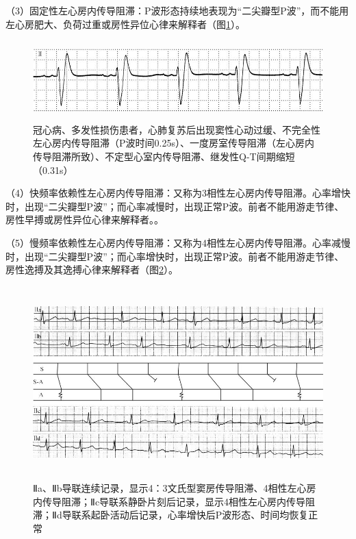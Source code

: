 （3）固定性左心房内传导阻滞：P波形态持续地表现为“二尖瓣型P波”，而不能用左心房肥大、负荷过重或房性异位心律来解释者（图\ref{fig19-5}）。

\begin{figure}[!htbp]
 \centering
 \includegraphics[width=5.60417in,height=1.20833in]{./images/Image00321.jpg}
 \captionsetup{justification=centering}
 \caption{冠心病、多发性损伤患者，心肺复苏后出现窦性心动过缓、不完全性左心房内传导阻滞（P波时间0.25s）、一度房室传导阻滞（左心房内传导阻滞所致）、不定型心室内传导阻滞、继发性Q-T间期缩短（0.31s）}
 \label{fig19-5}
  \end{figure} 

（4）快频率依赖性左心房内传导阻滞：又称为3相性左心房内传导阻滞。心率增快时，出现“二尖瓣型P波”；而心率减慢时，出现正常P波。前者不能用游走节律、房性早搏或房性异位心律来解释者。。

（5）慢频率依赖性左心房内传导阻滞：又称为4相性左心房内传导阻滞。心率减慢时，出现“二尖瓣型P波”；而心率增快时，出现正常P波。前者不能用游走节律、房性逸搏及其逸搏心律来解释者（图\ref{fig19-6}）。

\begin{figure}[!htbp]
 \centering
 \includegraphics[width=5.57292in,height=2.92708in]{./images/Image00322.jpg}
 \captionsetup{justification=centering}
 \caption{Ⅱa、Ⅱb导联连续记录，显示4：3文氏型窦房传导阻滞、4相性左心房内传导阻滞；Ⅱc导联系静卧片刻后记录，显示4相性左心房内传导阻滞；Ⅱd导联系起卧活动后记录，心率增快后P波形态、时间均恢复正常}
 \label{fig19-6}
  \end{figure} 

